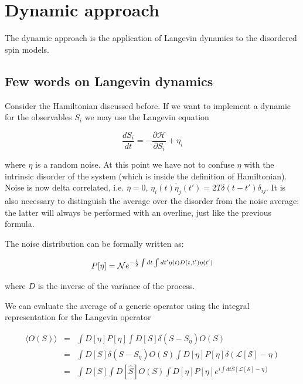 \documentclass{article}
\begin{document}
\section{Dynamic approach}

The dynamic approach is the application of Langevin dynamics to the disordered
spin models. 

\subsection{Few words on Langevin dynamics}

Consider the Hamiltonian discussed before. If we want to implement a dynamic
for the observables $S_i$ we may use the Langevin equation

\begin{equation}
  \frac{dS_i}{dt} = - \frac{\partial \mathcal{H}}{\partial S_i} + \eta_i
\end{equation}

where $\eta$ is a random noise. At this point we have not to confuse $\eta$
with the intrinsic disorder of the system (which is inside the definition of
Hamiltonian). Noise is now delta correlated, i.e. $\bar{\eta} = 0$,
$\overline{\eta_i (t) \eta_j (t')} = 2 T \delta (t - t') \delta_{ij}$. It is
also necessary to distinguish the average over the disorder from the noise
average: the latter will always be performed with an overline, just like the
previous formula.

The noise distribution can be formally written as:

\begin{equation}
P[\eta] = \mathcal{N} e^{-{1\over2}\int dt \int dt' \eta(t) D(t,t') \eta(t')}
\end{equation}

where $D$ is the inverse of the variance of the process.

We can evaluate the average of a generic operator using the integral representation for the Langevin operator

\begin{eqnarray}
\langle O(S) \rangle &=& \int D[\eta] P[\eta] \int D[S] \delta(S - S_\eta) O(S) \\
			&=& 	\int D[S] \delta(S - S_\eta) O(S)\int D[\eta]P[\eta]\delta(\mathcal{L[S]} - \eta)\\
			&=& 	\int D[S] \int D[\hat{S}]  O(S)\int D[\eta]P[\eta] e^{i \int dt \hat{S} [\mathcal{L[S]} - \eta] }
\end{eqnarray}
\end{document}
